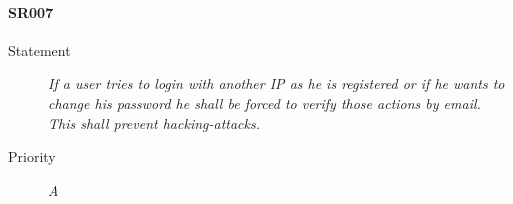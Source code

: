 \paragraph{SR007}
  \begin{description}
  \item [Statement] 
    \textit{ If a user tries to login with another IP as he is registered or if he wants to change his password
			he shall be forced to verify those actions by email.
			This shall prevent hacking-attacks.}
  \item [Priority] \textit{A}
\end{description}